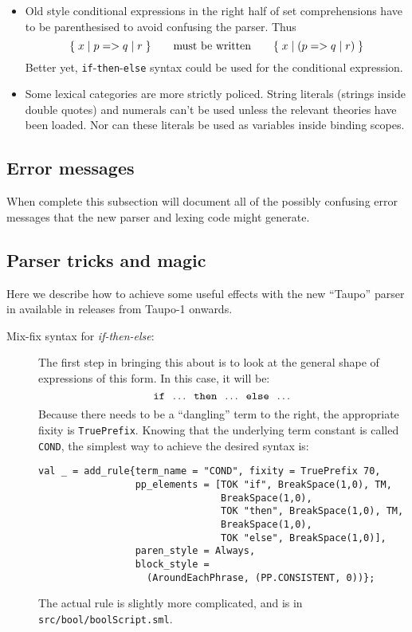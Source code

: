 {\begin{itemize}
  believing that the binding between the \verb+let+ and the \verb+in+
  is not an equality after all, as it should be.
\item Old style conditional expressions in the right half of set
  comprehensions have to be parenthesised to avoid confusing the
  parser.  Thus \[
  \{ \; x \; | \; \mbox{$p \; {\tt =>} \; q \; {\tt |} \; r$} \; \}
   \qquad\mbox{must be written} \qquad
  \{ \; x \; | \; (\mbox{$p \; {\tt =>} \; q \; {\tt |} \; r$}) \; \}
  \] Better yet, {\tt if}-{\tt then}-{\tt else} syntax could be used
  for the conditional expression.
\item Some lexical categories are more strictly policed.  String
  literals (strings inside double quotes) and numerals can't be used
  unless the relevant theories have been loaded.  Nor can these
  literals be used as variables inside binding scopes.
\end{itemize}

\subsection{Error messages}

When complete this subsection will document all of the possibly
confusing error messages that the new parser and lexing code might
generate.

\subsection{Parser tricks and magic}

Here we describe how to achieve some useful effects with the new
``Taupo'' parser in \holn{} available in releases from \mbox{Taupo-1}
onwards.

\begin{description}
\item [Mix-fix syntax for {\it if-then-else}:] The first step in
  bringing this about is to look at the general shape of expressions
  of this form.  In this case, it will be:
  \[
  \mbox{\tt if}\;\; \dots \;\;\mbox{\tt then}\;\;\dots\;\;
  \mbox{\tt else}\;\;\dots
  \]
  Because there needs to be a ``dangling'' term to the right, the
  appropriate fixity is \texttt{TruePrefix}.  Knowing that the
  underlying term constant is called \texttt{COND}, the simplest way
  to achieve the desired syntax is:
  \begin{verbatim}
val _ = add_rule{term_name = "COND", fixity = TruePrefix 70,
                 pp_elements = [TOK "if", BreakSpace(1,0), TM,
                                BreakSpace(1,0),
                                TOK "then", BreakSpace(1,0), TM,
                                BreakSpace(1,0),
                                TOK "else", BreakSpace(1,0)],
                 paren_style = Always,
                 block_style =
                   (AroundEachPhrase, (PP.CONSISTENT, 0))};
\end{verbatim}
  \noindent The actual rule is slightly more complicated, and is
  in \texttt{src/bool/boolScript.sml}.



\end{description}}
